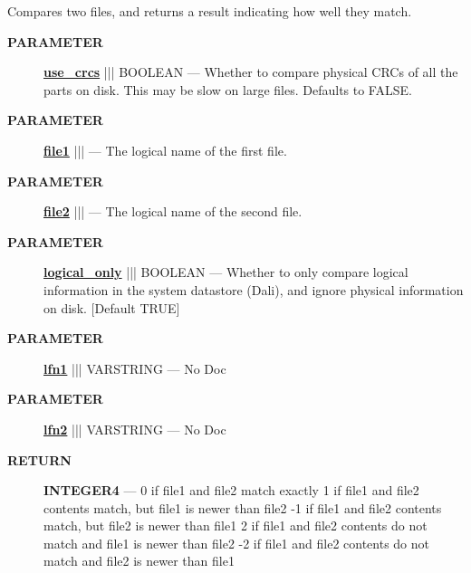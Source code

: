\par





Compares two files, and returns a result indicating how well they match.






\par
\begin{description}
\item [\colorbox{tagtype}{\color{white} \textbf{\textsf{PARAMETER}}}] \textbf{\underline{use\_crcs}} ||| BOOLEAN --- Whether to compare physical CRCs of all the parts on disk. This may be slow on large files. Defaults to FALSE.
\item [\colorbox{tagtype}{\color{white} \textbf{\textsf{PARAMETER}}}] \textbf{\underline{file1}} |||  --- The logical name of the first file.
\item [\colorbox{tagtype}{\color{white} \textbf{\textsf{PARAMETER}}}] \textbf{\underline{file2}} |||  --- The logical name of the second file.
\item [\colorbox{tagtype}{\color{white} \textbf{\textsf{PARAMETER}}}] \textbf{\underline{logical\_only}} ||| BOOLEAN --- Whether to only compare logical information in the system datastore (Dali), and ignore physical information on disk. [Default TRUE]
\item [\colorbox{tagtype}{\color{white} \textbf{\textsf{PARAMETER}}}] \textbf{\underline{lfn1}} ||| VARSTRING --- No Doc
\item [\colorbox{tagtype}{\color{white} \textbf{\textsf{PARAMETER}}}] \textbf{\underline{lfn2}} ||| VARSTRING --- No Doc
\end{description}







\par
\begin{description}
\item [\colorbox{tagtype}{\color{white} \textbf{\textsf{RETURN}}}] \textbf{INTEGER4} --- 0 if file1 and file2 match exactly 1 if file1 and file2 contents match, but file1 is newer than file2 -1 if file1 and file2 contents match, but file2 is newer than file1 2 if file1 and file2 contents do not match and file1 is newer than file2 -2 if file1 and file2 contents do not match and file2 is newer than file1
\end{description}




